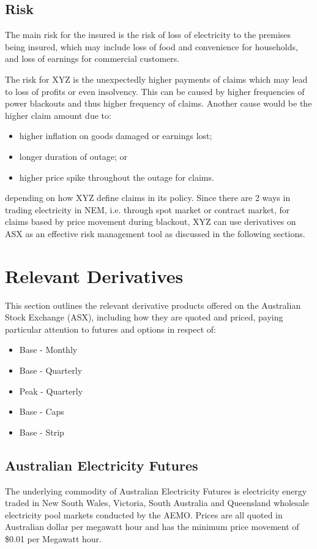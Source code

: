 \documentclass[12pt]{article}
\begin{document}
\subsection{Risk}
\begin{flushleft}
The main risk for the insured is the risk of loss of electricity to the premises being insured, which may include loss of food and convenience for households, and loss of earnings for commercial customers. \par
The risk for XYZ is the unexpectedly higher payments of claims which may lead to loss of profits or even insolvency. This can be caused by higher frequencies of power blackouts and thus higher frequency of claims. Another cause would be the higher claim amount due to:
\begin{itemize}
    \item higher inflation on goods damaged or earnings lost;
    \item longer duration of outage; or
    \item higher price spike throughout the outage for claims.
\end{itemize}
depending on how XYZ define claims in its policy. Since there are 2 ways in trading electricity in NEM, i.e. through spot market or contract market, for claims based by price movement during blackout, XYZ can use derivatives on ASX as an effective risk management tool as discussed in the following sections. 
\end{flushleft}
\newpage


\section{Relevant Derivatives}
\begin{flushleft}
This section outlines the relevant derivative products offered on the Australian Stock Exchange (ASX), including how they are quoted and priced, paying particular attention to futures and options in respect of: 
\begin{itemize}
 \item Base - Monthly
 \item Base - Quarterly
 \item Peak - Quarterly
 \item Base - Caps
 \item Base - Strip
\end{itemize}
\end{flushleft}

\subsection{Australian Electricity Futures}
\begin{flushleft}
The underlying commodity of Australian Electricity Futures is electricity energy traded in New South Wales, Victoria, South Australia and Queensland wholesale electricity pool markets conducted by the AEMO. Prices are all quoted in Australian dollar per megawatt hour and has the minimum price movement of \$0.01 per Megawatt hour. 
\end{flushleft}
\end{document}
